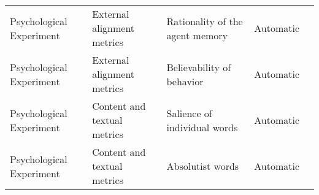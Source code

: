 \begin{small}
\begin{center}
\begin{longtable}{@{}p{}p{}p{}p{}p{}@{}}
Psychological Experiment & External alignment metrics          & Rationality of the agent memory                                                                                                                                                                             & Automatic & \cite{Wang2023UserBS}                                                                                                                                                                                                                                                                                                                                                                                            \\
Psychological Experiment & External alignment metrics          & Believability of behavior                                                                                                                                                                                   & Automatic & \cite{Wang2023UserBS}                                                                                                                                                                                                                                                                                                                                                                                                 \\
Psychological Experiment & Content and textual metrics         & Salience of individual words                                                                                                                                                                                & Automatic & \cite{de2025introducing}                                                                                                                                                                                                                                                                                                           \\
Psychological Experiment & Content and textual metrics         & Absolutist words                                                                                                                                                                                            & Automatic & \cite{de2025introducing}                                                                                                                                                                                                                                                                                                           \\

\end{longtable}
\end{center}
\end{small}
